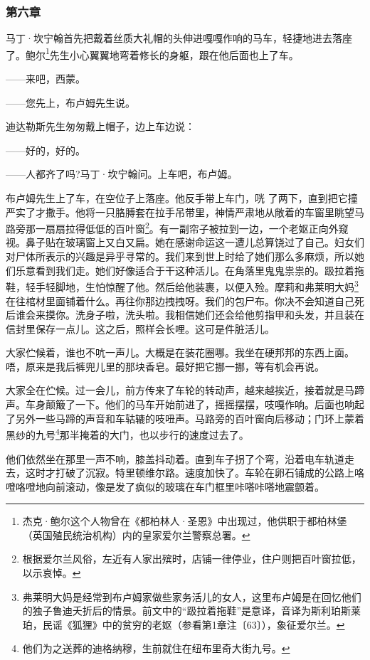 \subsubsection*{第六章}

\par 马丁·坎宁翰首先把戴着丝质大礼帽的头伸进嘎嘎作响的马车，轻捷地进去落座了。鲍尔\footnote{杰克·鲍尔这个人物曾在《都柏林人·圣恩》中出现过，他供职于都柏林堡（英国殖民统治机构）内的皇家爱尔兰警察总署。}先生小心翼翼地弯着修长的身躯，跟在他后面也上了车。
\par ——来吧，西蒙。
\par ——您先上，布卢姆先生说。
\par 迪达勒斯先生匆匆戴上帽子，边上车边说：
\par ——好的，好的。
\par ——人都齐了吗?马丁·坎宁翰问。上车吧，布卢姆。
\par 布卢姆先生上了车，在空位子上落座。他反手带上车门，咣 了两下，直到把它撞严实了才撒手。他将一只胳膊套在拉手吊带里，神情严肃地从敞着的车窗里眺望马路旁那一扇扇拉得低低的百叶窗\footnote{根据爱尔兰风俗，左近有人家出殡时，店铺一律停业，住户则把百叶窗拉低，以示哀悼。}。有一副帘子被拉到一边，一个老妪正向外窥视。鼻子贴在玻璃窗上又白又扁。她在感谢命运这一遭儿总算饶过了自己。妇女们对尸体所表示的兴趣是异乎寻常的。我们来到世上时给了她们那么多麻烦，所以她们乐意看到我们走。她们好像适合于干这种活儿。在角落里鬼鬼祟祟的。趿拉着拖鞋，轻手轻脚地，生怕惊醒了他。然后给他装裹，以便入殓。摩莉和弗莱明大妈\footnote{弗莱明大妈是经常到布卢姆家做些家务活儿的女人，这里布卢姆是在回忆他们的独子鲁迪夭折后的情景。前文中的“趿拉着拖鞋”是意译，音译为斯利珀斯莱珀，民谣《狐狸》中的贫穷的老妪（参看第1章注〔63〕），象征爱尔兰。}在往棺材里面铺着什么。再往你那边拽拽呀。我们的包尸布。你决不会知道自己死后谁会来摸你。洗身子啦，洗头啦。我相信她们还会给他剪指甲和头发，并且装在信封里保存一点儿。这之后，照样会长哩。这可是件脏活儿。
\par 大家伫候着，谁也不吭一声儿。大概是在装花圈哪。我坐在硬邦邦的东西上面。唔，原来是我后裤兜儿里的那块香皂。最好把它挪一挪，等有机会再说。
\par 大家全在伫候。过一会儿，前方传来了车轮的转动声，越来越挨近，接着就是马蹄声。车身颠簸了一下。他们的马车开始前进了，摇摇摆摆，吱嘎作响。后面也响起了另外一些马蹄的声音和车轱辘的吱吜声。马路旁的百叶窗向后移动；门环上蒙着黑纱的九号\footnote{他们为之送葬的迪格纳穆，生前就住在纽布里奇大街九号。}那半掩着的大门，也以步行的速度过去了。
\par 他们依然坐在那里一声不响，膝盖抖动着。直到车子拐了个弯，沿着电车轨道走去，这时才打破了沉寂。特里顿维尔路。速度加快了。车轮在卵石铺成的公路上咯噔咯噔地向前滚动，像是发了疯似的玻璃在车门框里咔嗒咔嗒地震颤着。
